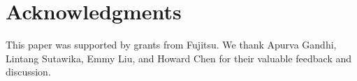 \section*{Acknowledgments}
This paper was supported by grants from Fujitsu. We thank Apurva Gandhi, Lintang Sutawika, Emmy Liu, and Howard Chen for their valuable feedback and discussion.